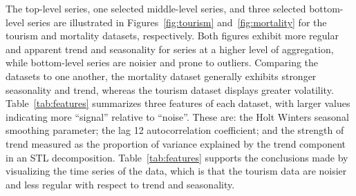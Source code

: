 \documentclass[a4paper,review,12pt,authoryear]{elsarticle}
\let\code=\texttt
\begin{document}

The top-level series, one selected middle-level series, and three selected bottom-level series are illustrated in Figures~\ref{fig:tourism} and~\ref{fig:mortality} for the tourism and mortality datasets, respectively. 
Both figures exhibit more regular and apparent trend and seasonality for series at a higher level of aggregation, while bottom-level series are noisier and prone to outliers. 
Comparing the datasets to one another, the mortality dataset generally exhibits stronger seasonality and trend, whereas the tourism dataset displays greater volatility. Table~\ref{tab:features} summarizes three features of each dataset, with larger values indicating more ``signal'' relative to ``noise''. These are: the Holt Winters seasonal smoothing parameter; the lag 12 autocorrelation coefficient; and the strength of trend measured as the proportion of variance explained by the trend component in an STL decomposition. Table~\ref{tab:features} supports the conclusions made by visualizing the time series of the data, which is that the tourism data are noisier and less regular with respect to trend and seasonality.



\end{document}
